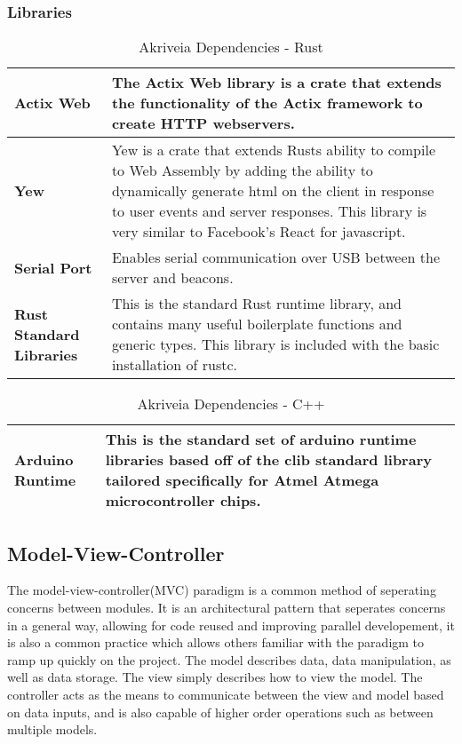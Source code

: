 \subsubsection{Libraries}
\label{software_libraries}

\begin{table}[H]
\centering
\begin{tabular}{ | m{3.25cm} | m{12.5cm} |}
	\hline
	\textbf{Actix Web} & The Actix Web library is a crate that extends the functionality of the Actix framework to create HTTP webservers. \\
	\hline
	\textbf{Yew} & Yew is a crate that extends Rusts ability to compile to Web Assembly by adding the ability to dynamically generate html on the client in response to user events and server responses. This library is very similar to Facebook's React for javascript. \\
	\hline
	\textbf{Serial Port} & Enables serial communication over USB between the server and beacons.\\
	\hline
	\textbf{Rust Standard Libraries} & This is the standard Rust runtime library, and contains many useful boilerplate functions and generic types. This library is included with the basic installation of rustc. \\
	\hline
\end{tabular}
\caption{Akriveia Dependencies - Rust}
\end{table}

\begin{table}[H]
\centering
\begin{tabular}{ | m{3.25cm} | m{12.5cm} |}
	\hline
	\textbf{Arduino Runtime} & This is the standard set of arduino runtime libraries based off of the clib standard library tailored specifically for Atmel Atmega microcontroller chips. \\
	\hline
\end{tabular}
\caption{Akriveia Dependencies - C++}
\end{table}

\bigskip
\subsection{Model-View-Controller}
The model-view-controller(MVC) paradigm is a common method of seperating concerns between modules.
It is an architectural pattern that seperates concerns in a general way, allowing for code reused and improving parallel developement, it is also a common practice which allows others familiar with the paradigm to ramp up quickly on the project.
The model describes data, data manipulation, as well as data storage.
The view simply describes how to view the model.
The controller acts as the means to communicate between the view and model based on data inputs, and is also capable of higher order operations such as between multiple models.

